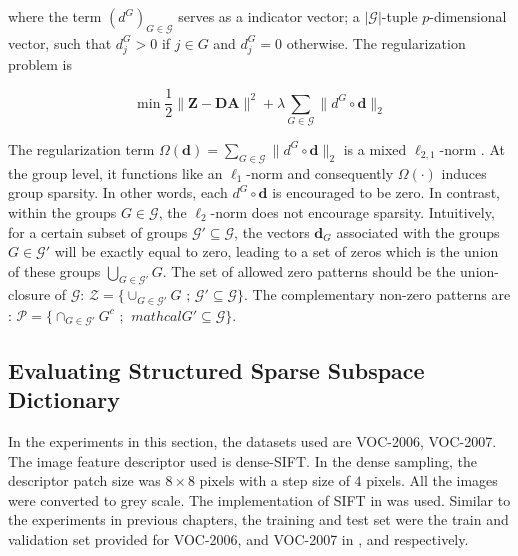 where the term $(d^{G})_{G \in \mathcal{G}}$ serves as a indicator vector; a $|\mathcal{G}|$-tuple $p$-dimensional vector, such that $d_{j}^{G} > 0$ if $j \in G$ and $d_{j}^{G} = 0$ otherwise. The regularization problem is

\begin{equation}
 \min \frac{1}{2} \parallel \mathbf{Z} - \mathbf{D} \mathbf{A} \parallel^{2} + \lambda \sum_{G \in \mathcal{G}} \parallel d^{G} \circ \mathbf{d} \parallel_{2}
\end{equation}

The regularization term $\Omega(\mathbf{d}) = \sum_{G \in \mathcal{G}} \parallel d^{G} \circ \mathbf{d} \parallel_{2}$ is a mixed $\ell_{2,1}$-norm \citep{Zhao2009}. At the group level, it functions like an $\ell_{1}$-norm and consequently $\Omega(\cdot)$ induces group sparsity. In other words, each $d^{G} \circ \mathbf{d}$ is encouraged to be zero. In contrast, within the groups $G \in \mathcal{G}$, the $\ell_{2}$-norm does not encourage sparsity. Intuitively, for a certain subset of groups $\mathcal{G}' \subseteq \mathcal{G}$, the vectors $\mathbf{d}_{G}$ associated with the groups $G \in \mathcal{G}'$ will be exactly equal to zero, leading to a set of zeros which is the union of these groups $\bigcup_{G \in \mathcal{G}'} G$. The set of allowed zero patterns should be the union-closure of $\mathcal{G}$: $\mathcal{Z} = \{ \cup_{G \in \mathcal{G}'} G \mbox{ ; } \mathcal{G}' \subseteq \mathcal{G} \}$. The complementary non-zero patterns are : $\mathcal{P} = \{ \cap_{G \in \mathcal{G}'} G^{c} \mbox{ ; } \
mathcal{G}' \subseteq \mathcal{G} \}$.

\subsection[Evaluating Structured Subspace Dictionary]{Evaluating Structured Sparse Subspace Dictionary}
\label{ch_groupsparse_subsec_eval_structuremanifold}

In the experiments in this section, the datasets used are VOC-2006, VOC-2007. The image feature descriptor used is dense-SIFT. In the dense sampling, the descriptor patch size was $8 \times 8$ pixels with a step size of $4$ pixels. All the images were converted to grey scale. The implementation of SIFT in \citep{Vedaldi2008} was used. Similar to the experiments in previous chapters, the training and test set were the train and validation set provided for VOC-2006, and VOC-2007 in \citep{pascalvoc2006}, and \citep{pascalvoc2007} respectively. 

